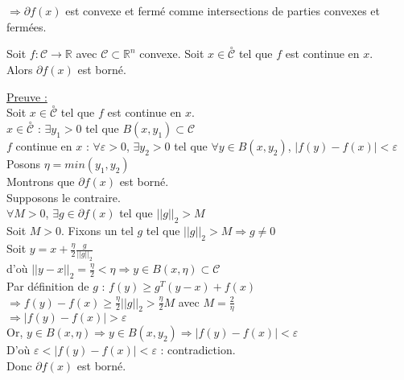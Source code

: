 \documentclass[12pt,a4paper]{article}
\newcommand{\propriete}[2]{%
    \begin{tcolorbox}[colback=white,colframe=green!25!white,title=\textbf{Propriété #1}, coltitle=black]
        #2
    \end{tcolorbox}
}
\begin{document}
$\Rightarrow \partial f(x)$ est convexe et fermé comme intersections de parties convexes et fermées.\\


\propriete{}{
    Soit $f : \mathcal{C} \rightarrow \mathbb{R}$ avec $\mathcal{C} \subset \mathbb{R}^n$ convexe.
    Soit $x \in \overset{\circ}{\mathcal{C}}$ tel que $f$ est continue en $x$.\\
    Alors $\partial f(x)$ est borné.
}

\noindent\underline{Preuve :}\\
Soit $x \in \overset{\circ}{\mathcal{C}}$ tel que $f$ est continue en $x$.\\
$x \in \overset{\circ}{\mathcal{C}}$ : $\exists y_1 > 0$ tel que $B(x, y_1) \subset \mathcal{C}$\\
$f$ continue en $x$ : $\forall \varepsilon > 0$, $\exists y_2 > 0$ tel que $\forall y \in B(x, y_2)$, $|f(y) - f(x)| < \varepsilon$\\

Posons $\eta = min(y_1, y_2)$\\

Montrons que $\partial f(x)$ est borné.\\
Supposons le contraire.\\
$\forall M > 0$, $\exists g \in \partial f(x)$ tel que $||g||_2 > M$\\
Soit $M > 0$. Fixons un tel $g$ tel que $||g||_2 > M \Rightarrow g \neq 0$\\

Soit $y = x + \frac{\eta}{2} \frac{g}{||g||_2}$\\
d'où $||y - x||_2 = \frac{\eta}{2} < \eta \Rightarrow y \in B(x, \eta) \subset \mathcal{C}$\\

Par définition de $g$ : $f(y) \geq g^T(y - x) + f(x)$\\
$\Rightarrow f(y) - f(x) \geq \frac{\eta}{2} ||g||_2 > \frac{\eta}{2} M$ avec $M = \frac{2}{\eta}$\\
$\Rightarrow |f(y) - f(x)| > \varepsilon$\\

Or, $y \in B(x, \eta) \Rightarrow y \in B(x, y_2) \Rightarrow |f(y) - f(x)| < \varepsilon$\\

D'où $\varepsilon < |f(y) - f(x)| < \varepsilon$ : contradiction.\\

Donc $\partial f(x)$ est borné.\\
\end{document}
